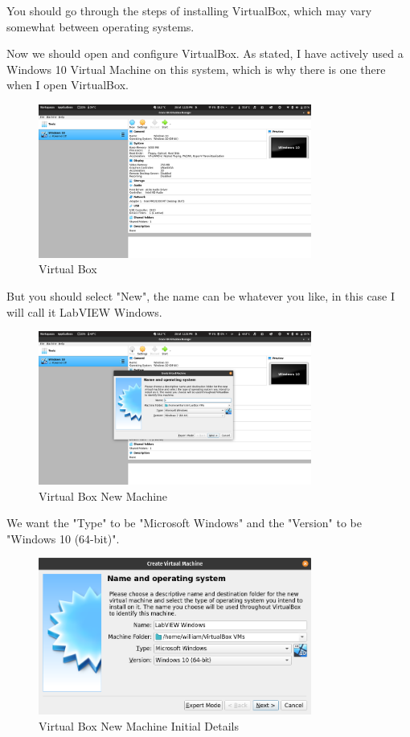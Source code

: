 \documentclass[a4paper,11pt]{report}
\begin{document}
You should go through the steps of installing VirtualBox, which may vary somewhat between operating systems.

Now we should open and configure VirtualBox. As stated, I have actively used a Windows 10 Virtual Machine on this system, which is why there is one there when I open VirtualBox.

\begin{figure}[H]
\centering
\includegraphics[width=0.8\textwidth]{screenshots/virtualbox}
\caption{Virtual Box}
\end{figure}

But you should select "New", the name can be whatever you like, in this case I will call it LabVIEW Windows.

\begin{figure}[H]
\centering
\includegraphics[width=0.8\textwidth]{screenshots/virtualboxsetup}
\caption{Virtual Box New Machine}
\end{figure}

We want the "Type" to be "Microsoft Windows" and the "Version" to be "Windows 10 (64-bit)".

\begin{figure}[H]
\centering
\includegraphics[width=0.8\textwidth]{screenshots/virtualboxsetupfilled}
\caption{Virtual Box New Machine Initial Details}
\end{figure}
\end{document}
